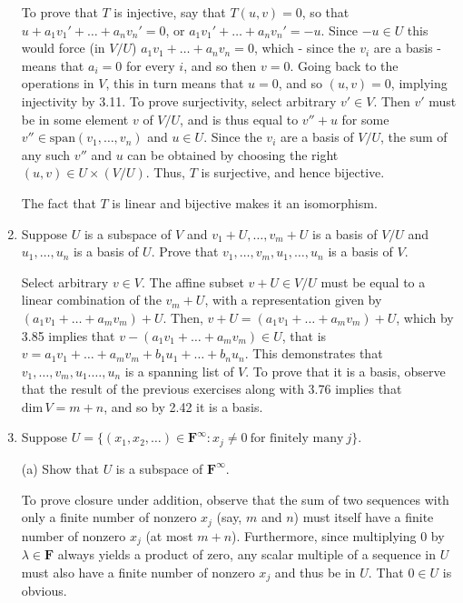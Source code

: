 \documentclass{book}
\begin{document}
\begin{enumerate}
To prove that \(T\) is injective, say that \(T(u,v)=0\), so that \(u+a_1v_1'+\dots+a_nv_n'=0\), or \(a_1v_1'+\dots+a_nv_n'=-u\).  Since \(-u \in U\) this would force (in \(V/U\)) \(a_1v_1+\dots+a_nv_n=0\), which - since the \(v_i\) are a basis - means that \(a_i=0\) for every \(i\), and so then \(v=0\).  Going back to the operations in \(V\), this in turn means that \(u = 0\), and so \((u,v)=0\), implying injectivity by 3.11.  To prove surjectivity, select arbitrary \(v' \in V\).  Then \(v'\) must be in some element \(v\) of \(V/U\), and is thus equal to \(v''+u\) for some \(v'' \in \text{span}(v_1,\dots,v_n)\) and \(u \in U\).  Since the \(v_i\) are a basis of \(V/U\), the sum of any such \(v''\) and \(u\) can be obtained by choosing the right \((u,v) \in U \times (V/U)\).  Thus, \(T\) is surjective, and hence bijective.

The fact that \(T\) is linear and bijective makes it an isomorphism.

\item Suppose \(U\) is a subspace of \(V\) and \(v_1+U,\dots,v_m+U\) is a basis of \(V/U\) and \(u_1,\dots,u_n\) is a basis of \(U\).  Prove that \(v_1,\dots,v_m,u_1,\dots,u_n\) is a basis of \(V\).

Select arbitrary \(v \in V\).  The affine subset \(v+U \in V/U\) must be equal to a linear combination of the \(v_m+U\), with a representation given by \((a_1v_1+\dots+a_mv_m)+U\).  Then, \(v+U = (a_1v_1+\dots+a_mv_m)+U\), which by 3.85 implies that \(v-(a_1v_1+\dots+a_mv_m) \in U\), that is \(v=a_1v_1+\dots+a_mv_m+b_1u_1+\dots+b_nu_n\).  This demonstrates that \(v_1,\dots,v_m,u_1.\dots,u_n\) is a spanning list of \(V\).  To prove that it is a basis, observe that the result of the previous exercises along with 3.76 implies that \(\text{dim} \, V = m+n\), and so by 2.42 it is a basis.

\item Suppose \(U=\{(x_1,x_2,\dots) \in \textbf{F}^{\infty}: x_j \neq 0 \ \textrm{for finitely many} \ j\}\).

(a) Show that \(U\) is a subspace of \(\textbf{F}^{\infty}\).

To prove closure under addition, observe that the sum of two sequences with only a finite number of nonzero \(x_j\) (say, \(m\) and \(n\)) must itself have a finite number of nonzero \(x_j\) (at most \(m+n\)).  Furthermore, since multiplying \(0\) by \(\lambda \in \textbf{F}\) always yields a product of zero, any scalar multiple of a sequence in \(U\) must also have a finite number of nonzero \(x_j\) and thus be in \(U\).  That \(0 \in U\) is obvious.


\end{enumerate}
\end{document}
